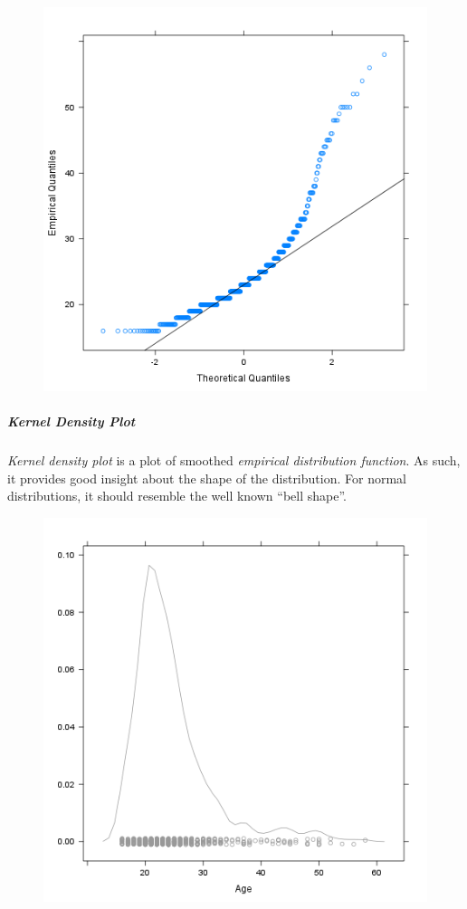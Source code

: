 \documentclass[]{article}
\makeatletter
\def\maxwidth{\ifdim\Gin@nat@width>\linewidth\linewidth
\else\Gin@nat@width\fi}
\let\Oldincludegraphics\includegraphics
\renewcommand{\includegraphics}[1]{\Oldincludegraphics[width=\maxwidth]{#1}}
\makeatother
\begin{document}
\begin{figure}[htbp]
\centering
\includegraphics{cbbba756d844aa053998959b73b9feff.png}
\caption{}
\end{figure}

\subparagraph{Kernel Density Plot}

\emph{Kernel density plot} is a plot of smoothed \emph{empirical
distribution function}. As such, it provides good insight about the
shape of the distribution. For normal distributions, it should resemble
the well known ``bell shape''.

\begin{figure}[htbp]
\centering
\includegraphics{bde5b5e4ca06fa103953fc17e5273291.png}
\caption{}
\end{figure}
\end{document}
